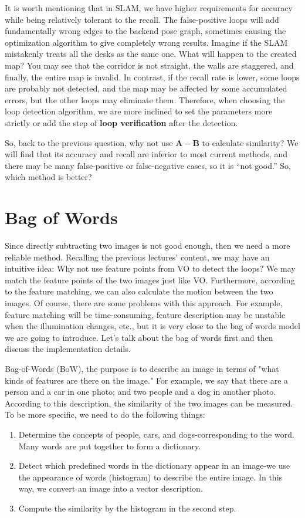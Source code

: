 It is worth mentioning that in SLAM, we have higher requirements for accuracy while being relatively tolerant to the recall. The false-positive loops will add fundamentally wrong edges to the backend pose graph, sometimes causing the optimization algorithm to give completely wrong results. Imagine if the SLAM mistakenly treats all the desks as the same one. What will happen to the created map? You may see that the corridor is not straight, the walls are staggered, and finally, the entire map is invalid. In contrast, if the recall rate is lower, some loops are probably not detected, and the map may be affected by some accumulated errors, but the other loops may eliminate them. Therefore, when choosing the loop detection algorithm, we are more inclined to set the parameters more strictly or add the step of \textbf{loop verification} after the detection.

So, back to the previous question, why not use $\bm{A}-\bm{B}$ to calculate similarity? We will find that its accuracy and recall are inferior to most current methods, and there may be many false-positive or false-negative cases, so it is ``not good.'' So, which method is better?

\section{Bag of Words}
Since directly subtracting two images is not good enough, then we need a more reliable method. Recalling the previous lectures' content, we may have an intuitive idea: Why not use feature points from VO to detect the loops? We may match the feature points of the two images just like VO. Furthermore, according to the feature matching, we can also calculate the motion between the two images. Of course, there are some problems with this approach. For example, feature matching will be time-consuming, feature description may be unstable when the illumination changes, etc., but it is very close to the bag of words model we are going to introduce. Let's talk about the bag of words first and then discuss the implementation details.

Bag-of-Words (BoW), the purpose is to describe an image in terms of "what kinds of features are there on the image." For example, we say that there are a person and a car in one photo; and two people and a dog in another photo. According to this description, the similarity of the two images can be measured. To be more specific, we need to do the following things:

\begin{enumerate}
	\item Determine the concepts of people, cars, and dogs-corresponding to the word. Many words are put together to form a dictionary.
	\item Detect which predefined words in the dictionary appear in an image-we use the appearance of words (histogram) to describe the entire image. In this way, we convert an image into a vector description.
	\item Compute the similarity by the histogram in the second step.
\end{enumerate}


